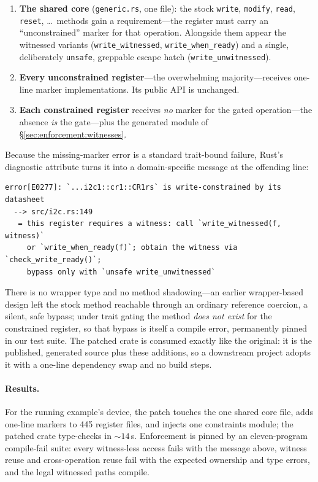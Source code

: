 \begin{enumerate}
\item \textbf{The shared core} (\texttt{generic.rs}, one file): the stock
  \texttt{write}, \texttt{modify}, \texttt{read}, \texttt{reset}, \ldots\
  methods gain a requirement---the register must carry an ``unconstrained''
  marker for that operation. Alongside them appear the witnessed variants
  (\texttt{write\_witnessed}, \texttt{write\_when\_ready}) and a single,
  deliberately \texttt{unsafe}, greppable escape hatch
  (\texttt{write\_unwitnessed}).
\item \textbf{Every unconstrained register}---the overwhelming
  majority---receives one-line marker implementations. Its public API is
  unchanged.
\item \textbf{Each constrained register} receives \emph{no} marker for the
  gated operation---the absence \emph{is} the gate---plus the generated
  module of \S\ref{sec:enforcement:witnesses}.
\end{enumerate}

Because the missing-marker error is a standard trait-bound failure, Rust's
diagnostic attribute turns it into a domain-specific message at the
offending line:

\begin{lstlisting}
error[E0277]: `...i2c1::cr1::CR1rs` is write-constrained by its datasheet
  --> src/i2c.rs:149
   = this register requires a witness: call `write_witnessed(f, witness)`
     or `write_when_ready(f)`; obtain the witness via `check_write_ready()`;
     bypass only with `unsafe write_unwitnessed`
\end{lstlisting}

There is no wrapper type and no method shadowing---an earlier wrapper-based
design left the stock method reachable through an ordinary reference
coercion, a silent, safe bypass; under trait gating the method \emph{does
not exist} for the constrained register, so that bypass is itself a compile
error, permanently pinned in our test suite. The patched crate is consumed
exactly like the original: it is the published, generated source plus these
additions, so a downstream project adopts it with a one-line dependency swap
and no build steps.

\paragraph{Results.}
For the running example's device, the patch touches the one shared core
file, adds one-line markers to 445 register files, and injects one
constraints module; the patched crate type-checks in ${\sim}14$\,s.
Enforcement is pinned by an eleven-program compile-fail suite: every
witness-less access fails with the message above, witness reuse and
cross-operation reuse fail with the expected ownership and type errors, and
the legal witnessed paths compile.

